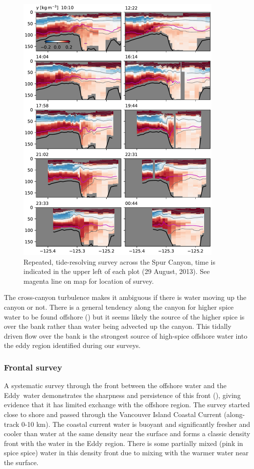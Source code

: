 \documentclass[draft]{agujournal2019}
\newcommand*{\Eddy}{{\sc Eddy}}
\begin{document}
\begin{figure}[htbp]
  \begin{center}
    \includegraphics[width=4in]{HydraulicsCanyon}
    \caption{Repeated, tide-resolving survey across the Spur Canyon, time is indicated in the upper left of each plot (29 August, 2013).  See magenta line on map  for location of survey.
      \label{fig:HydraulicsCanyon}
    }
  \end{center}
\end{figure}

The cross-canyon turbulence makes it ambiguous if there is water moving up the canyon or not.  There is a general tendency along the canyon for higher spice water to be found offshore () but it seems likely the source of the higher spice is over the bank rather than water being advected up the canyon.  This tidally driven flow over the bank is the strongest source of high-spice offshore water into the eddy region identified during our surveys.

\subsubsection{Frontal survey}
\label{sec:frontsurvey}

A systematic survey through the front between the offshore water and the \Eddy\ water demonstrates the sharpness and persistence of this front (), giving evidence that it has limited exchange with the offshore region.  The survey started close to shore and passed through the Vancouver Island Coastal Current (along-track 0-10 km).  The coastal current water is buoyant and significantly fresher and cooler than water at the same density near the surface and forms a classic density front with the water in the Eddy region.  There is some partially mixed (pink in spice spice) water in this density front due to mixing with the warmer water near the surface.
\end{document}
